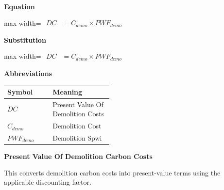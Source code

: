 \documentclass{article}
\begin{document}
\vspace{0.4em}
\textbf{Equation}\par\vspace{-0.35em}
\begin{center}
\begin{adjustbox}{max width=\linewidth}
$\displaystyle\begin{aligned}
DC &= C_{demo} \times PWF_{demo}
\end{aligned}$
\end{adjustbox}
\end{center}
\vspace{0.4em}
\textbf{Substitution}\par\vspace{-0.35em}
\begin{center}
\begin{adjustbox}{max width=\linewidth}
$\displaystyle\begin{aligned}
DC &= C_{demo} \times PWF_{demo}
\end{aligned}$
\end{adjustbox}
\end{center}
\vspace{0.4em}
\textbf{Abbreviations}\par\vspace{-0.35em}
\begin{tabularx}{\linewidth}{>{\raggedright\arraybackslash}p{0.43\linewidth} >{\raggedright\arraybackslash}X}
\toprule
Symbol & Meaning \\
\midrule
$DC$ & Present Value Of Demolition Costs \\
$C_{demo}$ & Demolition Cost \\
$PWF_{demo}$ & Demolition Spwi \\
\bottomrule
\end{tabularx}
\vspace{0.6em}
\vspace{0.4em}
\textbf{Present Value Of Demolition Carbon Costs}\par\vspace{-0.35em}
This converts demolition carbon costs into present-value terms using the applicable discounting factor.
\end{document}
